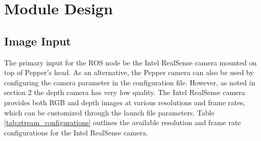 \documentclass{CSSRforAfrica}
\begin{document}
\newpage

\section{Module Design}

\subsection*{Image Input}
The primary input for the ROS node be the Intel RealSense camera mounted on top of Pepper's head. As an alternative, the Pepper camera can also be used by configuring the camera parameter in the configuration file. However, as noted in section 2 the depth camera has very low quality. The Intel RealSense camera provides both RGB and depth images at various resolutions and frame rates, which can be customized through the launch file parameters. Table \ref{tab:stream_configurations} outlines the available resolution and frame rate configurations for the Intel RealSense camera.
\end{document}
